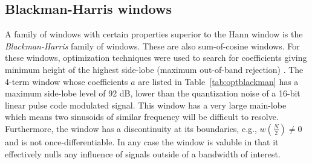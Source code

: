 \subsection{Blackman-Harris windows}

A family of windows with certain properties superior to the Hann window is the
\textit{Blackman-Harris} family of windows. These are also sum-of-cosine
windows. For these windows, optimization techniques were used to search for
coefficients giving minimum height of the highest side-lobe (maximum out-of-band
rejection) \cite{rabiner1970approach}. The 4-term window whose coefficients $a$
are listed in Table~\ref{tab:optblackman} has a maximum side-lobe level of 92
dB, lower than the quantization noise of a 16-bit linear pulse code modulated
signal. This window has a very large main-lobe which means two sinusoids of
similar frequency will be difficult to resolve. Furthermore, the window has a
discontinuity at its boundaries, e.g., $w \left( \frac{N}{2} \right) \neq 0$ and
is not once-differentiable. In any case the window is valuble in that it
effectively nulls any influence of signals outside of a bandwidth of interest.

